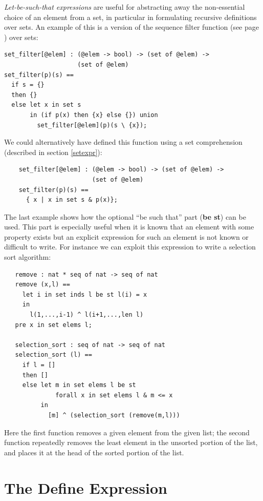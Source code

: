 \documentclass{overturerepchap}
\newcommand{\keyw}[1]{{\bf\ttfamily #1}}
\begin{document}
\begin{description}
  {\it Let-be-such-that expressions} are useful for abstracting away
  the non-essential choice of an element from a set, in particular in
  formulating recursive definitions over sets. An example of this is a
  version of the sequence filter function (see page \pageref{filterdef})
  over sets:\label{setfilterdef}
  \begin{lstlisting}
set_filter[@elem] : (@elem -> bool) -> (set of @elem) -> 
                    (set of @elem)
set_filter(p)(s) ==
  if s = {}
  then {}
  else let x in set s
       in (if p(x) then {x} else {}) union
         set_filter[@elem](p)(s \ {x});
   \end{lstlisting}
   We could alternatively have defined this function using a set
  comprehension (described in section \ref{setexpr}):
  \begin{lstlisting}
    set_filter[@elem] : (@elem -> bool) -> (set of @elem) -> 
                        (set of @elem)
    set_filter(p)(s) ==
      { x | x in set s & p(x)};
  \end{lstlisting} 

   The last example shows how the optional ``be such that'' part
   (\keyw{be st}) can be used. This part is especially useful when it
   is known that an element with some property exists but an explicit
   expression for such an element is not known or difficult to
  write. For instance we can exploit this expression to write a
  selection sort algorithm:
   \begin{lstlisting}
   remove : nat * seq of nat -> seq of nat
   remove (x,l) ==
     let i in set inds l be st l(i) = x
     in
       l(1,...,i-1) ^ l(i+1,...,len l)
   pre x in set elems l;

   selection_sort : seq of nat -> seq of nat
   selection_sort (l) ==
     if l = []
     then []
     else let m in set elems l be st
              forall x in set elems l & m <= x
          in
            [m] ^ (selection_sort (remove(m,l)))
   \end{lstlisting}
\label{selectionSortdef}
   Here the first function removes a given element from the given
   list; the second function repeatedly removes the least element in
   the unsorted portion of the list, and places it at the head of the
   sorted portion of the list.
\end{description}

\section{The Define Expression} \label{define-exp}
\end{document}
